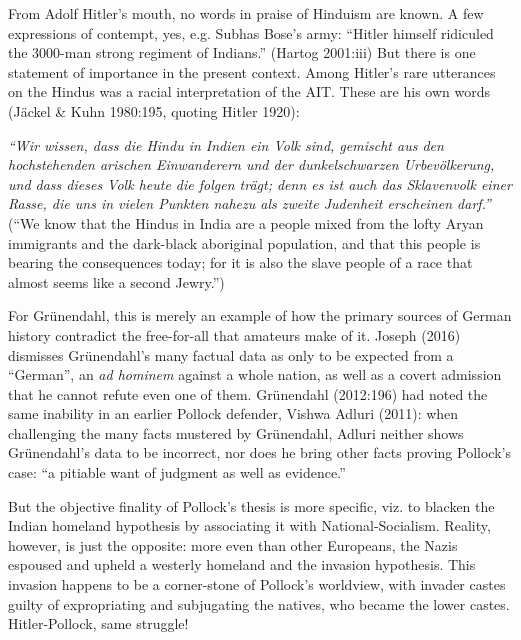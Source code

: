 From Adolf Hitler’s mouth, no words in praise of Hinduism are known. A few expressions of contempt, yes, e.g. Subhas Bose’s army: “Hitler himself ridiculed the 3000-man strong regiment of Indians.” (Hartog 2001:iii) But there is one statement of importance in the present context. Among Hitler’s rare utterances on the Hindus was a racial interpretation of the AIT. These are his own words (Jäckel \& Kuhn 1980:195, quoting Hitler 1920): 
\begin{myquote}
{\sl “Wir wissen, dass die Hindu in Indien ein Volk sind, gemischt aus den hochstehenden arischen Einwanderern und der dunkelschwarzen Urbevölkerung, und dass dieses Volk heute die folgen trägt; denn es ist auch das Sklavenvolk einer Rasse, die uns in vielen Punkten nahezu als zweite Judenheit erscheinen darf.”}
(“We know that the Hindus in India are a people mixed from the lofty Aryan immigrants and the dark-black aboriginal population, and that this people is bearing the consequences today; for it is also the slave people of a race that almost seems like a second Jewry.”)
\end{myquote}

For Grünendahl, this is merely an example of how the primary sources of German history contradict the free-for-all that amateurs make of it. Joseph (2016) dismisses Grünendahl’s many factual data as only to be expected from a “German”, an {\sl ad hominem} against a whole nation, as well as a covert admission that he cannot refute even one of them. Grünendahl (2012:196) had noted the same inability in an earlier Pollock defender, Vishwa Adluri (2011): when challenging the many facts mustered by Grünendahl, Adluri neither shows Grünendahl’s data to be incorrect, nor does he bring other facts proving Pollock’s case: “a pitiable want of judgment as well as evidence.”

But the objective finality of Pollock’s thesis is more specific, viz. to blacken the Indian homeland hypothesis by associating it with National-Socialism. Reality, however, is just the opposite: more even than other Europeans, the Nazis espoused and upheld a westerly homeland and the invasion hypothesis. This invasion happens to be a corner-stone of Pollock’s worldview, with invader castes guilty of expropriating and subjugating the natives, who became the lower castes. Hitler-Pollock, same struggle!

